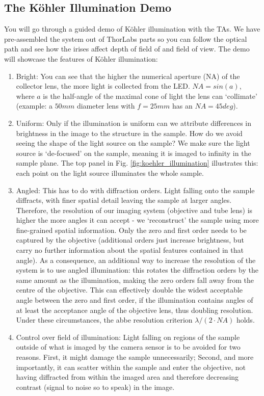 \documentclass[a4paper]{report}
\begin{document}
\subsection{The K\"{o}hler Illumination Demo}
You will go through a guided demo of K\"{o}hler illumination with the TAs. 
We have pre-assembled the system out of ThorLabs parts so you can follow the optical path and see how the irises affect depth of field of and field of view.
The demo will showcase the features of K\"{o}hler illumination:

\begin{enumerate}
    \item Bright: You can see that the higher the numerical aperture (NA) of the collector lens, the more light is collected from the LED. $NA=sin(a)$, where $a$ is the half-angle of the maximal cone of light the lens can `collimate' (example: a $50mm$ diameter lens with $f=25mm$ has an $NA=45deg$).
    \item Uniform: Only if the illumination is uniform can we attribute differences in brightness in the image to the structure in the sample. How do we avoid seeing the shape of the light source on the sample? We make sure the light source is `de-focused' on the sample, meaning it is imaged to infinity in the sample plane. The top panel in Fig. \ref{fig:koehler_illumination} illustrates this: each point on the light source illuminates the whole sample.
    \item Angled: This has to do with diffraction orders. Light falling onto the sample diffracts, with finer spatial detail leaving the sample at larger angles. Therefore, the resolution of our imaging system (objective and tube lens) is higher the more angles it can accept - we `reconstruct' the sample using more fine-grained spatial information. Only the zero and first order needs to be captured by the objective (additional orders just increase brightness, but carry no further information about the spatial features contained in that angle). As a consequence, an additional way to increase the resolution of the system is to use angled illumination: this rotates the diffraction orders by the same amount as the illumination, making the zero orders fall away from the centre of the objective. This can effectively double the widest acceptable angle between the zero and first order, if the illumination contains angles of at least the acceptance angle of the objective lens, thus doubling resolution. Under these circumstances, the abbe resolution criterion $\lambda / (2\cdot NA)$ holds.
    \item Control over field of illumination: Light falling on regions of the sample outside of what is imaged by the camera sensor is to be avoided for two reasons. First, it might damage the sample unnecessarily; Second, and more importantly, it can scatter within the sample and enter the objective, not having diffracted from within the imaged area and therefore decreasing contrast (signal to noise so to speak) in the image.

\end{enumerate}
\end{document}
